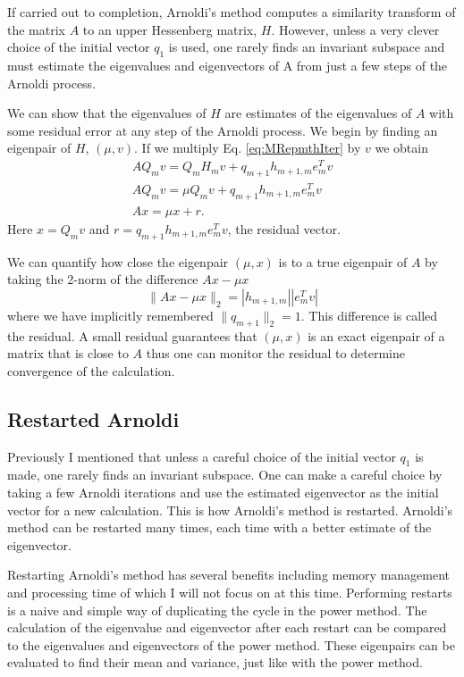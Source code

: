 \documentclass[11pt]{article}
\begin{document}
If carried out to completion, Arnoldi's method computes a similarity transform of the matrix $A$ to an upper Hessenberg matrix, $H$.  However, unless a very clever choice of the initial vector $q_1$ is used, one rarely finds an invariant subspace and must estimate the eigenvalues and eigenvectors of A from just a few steps of the Arnoldi process.

We can show that the eigenvalues of $H$ are estimates of the eigenvalues of $A$ with some residual error at any step of the Arnoldi process.  We begin by finding an eigenpair of $H$, $(\mu,v)$.  If we multiply Eq. \ref{eq:MRepmthIter} by $v$ we obtain
\begin{subequations}\begin{gather}
    AQ_mv = Q_{m}H_{m}v + q_{m+1}h_{m+1,m}e_m^Tv   \\
    AQ_mv = \mu Q_mv + q_{m+1}h_{m+1,m}e_m^Tv      \\[4mm]  \label{eq:FullResidual}
    Ax = \mu x + r.
\end{gather}\end{subequations}
Here $x = Q_mv$ and $r = q_{m+1}h_{m+1,m}e_m^Tv$, the residual vector.  

We can quantify how close the eigenpair $(\mu,x)$ is to a true eigenpair of $A$ by taking the 2-norm of the difference $Ax-\mu x$
\begin{equation}
    \|Ax - \mu x\|_2 = |h_{m+1,m}||e_m^Tv|
\end{equation}
where we have implicitly remembered $\|q_{m+1}\|_2 = 1$.  This difference is called the residual.  A small residual guarantees that $(\mu, x)$ is an exact eigenpair of a matrix that is close to $A$ thus one can monitor the residual to determine convergence of the calculation.

\subsection{Restarted Arnoldi}
Previously I mentioned that unless a careful choice of the initial vector $q_1$ is made, one rarely finds an invariant subspace.  One can make a careful choice by taking a few Arnoldi iterations and use the estimated eigenvector as the initial vector for a new calculation.  This is how Arnoldi's method is restarted.  Arnoldi's method can be restarted many times, each time with a better estimate of the eigenvector.

Restarting Arnoldi's method has several benefits including memory management and processing time of which I will not focus on at this time.  Performing restarts is a naive and simple way of duplicating the cycle in the power method.  The calculation of the eigenvalue and eigenvector after each restart can be compared to the eigenvalues and eigenvectors of the power method.  These eigenpairs can be evaluated to find their mean and variance, just like with the power method.  
\end{document}
